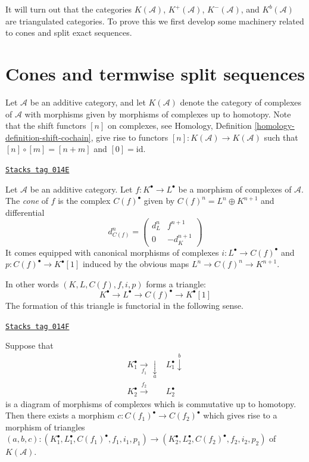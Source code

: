 It will turn out that the categories $K(\mathcal{A})$,
$K^{+}(\mathcal{A})$, $K^{-}(\mathcal{A})$, and $K^b(\mathcal{A})$
are triangulated categories. To prove this we first develop
some machinery related to cones and split exact sequences.

\section{Cones and termwise split sequences}
\label{derived-section-cones}
Let $\mathcal{A}$ be an additive category, and let
$K(\mathcal{A})$ denote the category of complexes of
$\mathcal{A}$ with morphisms given by morphisms of
complexes up to homotopy. Note that the shift functors
$[n]$ on complexes, see
Homology, Definition \ref{homology-definition-shift-cochain},
give rise to functors $[n] : K(\mathcal{A}) \to K(\mathcal{A})$
such that $[n] \circ [m] = [n + m]$ and $[0] = \text{id}$.

\begin{definition}[Cone]
\label{derived-definition-cone}
\href{https://stacks.math.columbia.edu/tag/014E}{\texttt{Stacks tag 014E}}

Let $\mathcal{A}$ be an additive category.
Let $f : K^\bullet \to L^\bullet$ be a morphism of
complexes of $\mathcal{A}$. The {\it cone} of $f$
is the complex $C(f)^\bullet$ given by
$C(f)^n = L^n \oplus K^{n + 1}$ and
differential
$$
d_{C(f)}^n =
\left(
\begin{matrix}
d^n_L & f^{n + 1} \\
0 & -d_K^{n + 1}
\end{matrix}
\right)
$$
It comes equipped with canonical morphisms of complexes
$i : L^\bullet \to C(f)^\bullet$ and $p : C(f)^\bullet \to K^\bullet[1]$
induced by the obvious maps $L^n \to C(f)^n \to K^{n + 1}$.
\end{definition}

In other words $(K, L, C(f), f, i, p)$ forms a triangle:
$$
K^\bullet \to L^\bullet \to C(f)^\bullet \to K^\bullet[1]
$$
The formation of this triangle is
functorial in the following sense.

\begin{lemma}
\label{derived-lemma-functorial-cone}
\href{https://stacks.math.columbia.edu/tag/014F}{\texttt{Stacks tag 014F}}

Suppose that
$$
\begin{array}{cc}K_1^\bullet \underset{f_1}{\longrightarrow}\underset{a}{\downarrow} & L_1^\bullet \overset{b}{\downarrow} \\ K_2^\bullet \overset{f_2}{\longrightarrow} & L_2^\bullet\end{array}
$$
is a diagram of morphisms of complexes which is commutative
up to homotopy. Then there exists a morphism
$c : C(f_1)^\bullet \to C(f_2)^\bullet$ which gives rise to
a morphism of triangles
$(a, b, c) : (K_1^\bullet, L_1^\bullet, C(f_1)^\bullet, f_1, i_1, p_1)
\to
(K_2^\bullet, L_2^\bullet, C(f_2)^\bullet, f_2, i_2, p_2)$
of $K(\mathcal{A})$.
\end{lemma}

